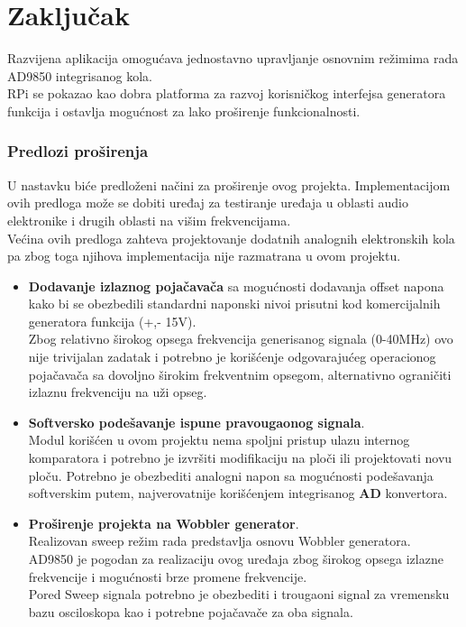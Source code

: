 \section{Zaključak}

Razvijena aplikacija omogućava jednostavno upravljanje osnovnim režimima rada
AD9850 integrisanog kola. \\
RPi se pokazao kao dobra platforma za razvoj korisničkog interfejsa generatora
funkcija i ostavlja mogućnost za lako proširenje funkcionalnosti. \\

\subsubsection{Predlozi proširenja}
U nastavku biće predloženi načini za proširenje ovog projekta.
Implementacijom ovih predloga može se dobiti uređaj za testiranje uređaja u oblasti audio elektronike
i drugih oblasti na višim frekvencijama. \\
Većina ovih predloga zahteva projektovanje dodatnih analognih
elektronskih kola pa zbog toga njihova implementacija nije razmatrana u ovom projektu. \\

\begin{itemize}
\item \textbf{Dodavanje izlaznog pojačavača} sa mogućnosti dodavanja
  offset napona kako bi se obezbedili standardni naponski nivoi prisutni kod
  komercijalnih generatora funkcija (+,- 15V). \\
  Zbog relativno širokog opsega frekvencija generisanog signala (0-40MHz) ovo
  nije trivijalan zadatak i potrebno je korišćenje odgovarajućeg operacionog
  pojačavača sa dovoljno širokim frekventnim opsegom, alternativno ograničiti
  izlaznu frekvenciju na uži opseg.

\item \textbf{Softversko podešavanje ispune pravougaonog signala}. \\
  Modul korišćen u ovom projektu nema spoljni pristup ulazu internog komparatora i
  potrebno je izvršiti modifikaciju na ploči ili projektovati novu ploču.
  Potrebno je obezbediti analogni napon sa mogućnosti podešavanja softverskim
  putem, najverovatnije korišćenjem integrisanog \textbf{AD} konvertora.

\item \textbf{Proširenje projekta na Wobbler generator}. \\
  Realizovan sweep režim rada predstavlja osnovu Wobbler generatora. \\
  AD9850 je pogodan za realizaciju ovog uređaja zbog širokog opsega izlazne
  frekvencije i mogućnosti brze promene frekvencije. \\
  Pored Sweep signala potrebno je obezbediti i trougaoni signal za vremensku
  bazu osciloskopa kao i potrebne pojačavače za oba signala.

\end{itemize}


